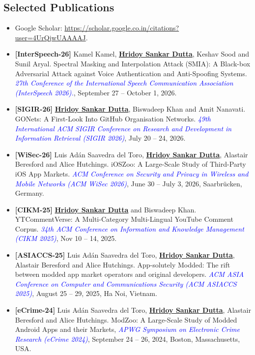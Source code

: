 \documentclass[margin, centered]{res}
\begin{document}
\begin{resume}
\section{Selected Publications}
\begin{itemize}[leftmargin=*]
\item[] Google Scholar:  \url{https://scholar.google.co.in/citations?user=4UrQjwUAAAAJ}.
\item \textbf{[InterSpeech-26]} Kamel Kamel, \textbf{\underline{Hridoy Sankar Dutta}},  Keshav Sood and Sunil Aryal. Spectral Masking and Interpolation Attack (SMIA): A Black-box Adversarial Attack against Voice Authentication and Anti-Spoofing Systems. \textit{\textcolor{blue}{27th Conference of the International Speech Communication Association (InterSpeech 2026).}}, September 27 – October 1, 2026.
\item \textbf{[SIGIR-26]} \textbf{\underline{Hridoy Sankar Dutta}},  Biswadeep Khan and Amit Nanavati. GONets: A First-Look Into GitHub Organisation Networks. \textit{\textcolor{blue}{49th International ACM SIGIR Conference on Research and Development in Information Retrieval (SIGIR 2026)}}, July 20 – 24, 2026.
\item  \textbf{[WiSec-26]} Luis Adán Saavedra del Toro,  \textbf{\underline{Hridoy Sankar Dutta}}, Alastair Beresford and Alice Hutchings. iOSZoo: A Large-Scale Study of Third-Party iOS App Markets.   \textit{\textcolor{blue}{ ACM Conference on Security and Privacy in Wireless and Mobile Networks (ACM WiSec 2026)}}, June 30 –  July 3, 2026, Saarbrücken, Germany.
\item  \textbf{[CIKM-25]} \textbf{\underline{Hridoy Sankar Dutta}} and Biswadeep Khan. YTCommentVerse: A Multi-Category Multi-Lingual YouTube Comment Corpus. \textit{\textcolor{blue}{34th ACM Conference on Information and Knowledge Management (CIKM 2025)}}, Nov 10 – 14, 2025.
\item \textbf{[ASIACCS-25]}  Luis Adán Saavedra del Toro,  \textbf{\underline{Hridoy Sankar Dutta}}, Alastair Beresford and Alice Hutchings. App-solutely Modded: The rift between modded app market operators and original developers.   \textit{\textcolor{blue}{ACM ASIA Conference on Computer and Communications Security (ACM ASIACCS 2025)}}, August 25 – 29, 2025, Ha Noi, Vietnam.
\item  \textbf{[eCrime-24]}  Luis Adán Saavedra del Toro,  \textbf{\underline{Hridoy Sankar Dutta}}, Alastair Beresford and Alice Hutchings.  ModZoo: A Large-Scale Study of Modded Android Apps and their Markets,  \textit{\textcolor{blue}{APWG Symposium on Electronic Crime Research (eCrime 2024)}}, September 24 – 26, 2024, Boston, Massachusetts, USA.

\end{itemize}
\end{resume}
\end{document}
